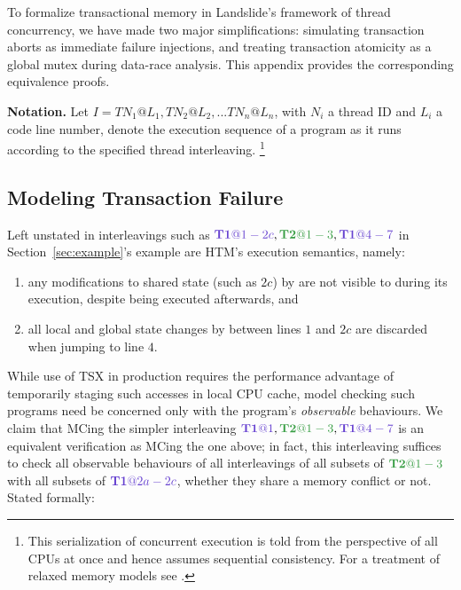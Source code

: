\documentclass{article}
\begin{document}
To formalize transactional memory in Landslide's framework of thread concurrency,
we have made two major simplifications:
simulating transaction aborts as immediate failure injections,
and treating transaction atomicity as a global mutex during data-race analysis.
This appendix provides the corresponding equivalence proofs.

{\bf Notation.} Let $I = TN_1@L_1, TN_2@L_2, ... TN_n@L_n$,
with $N_i$ a thread ID and $L_i$ a code line number,
denote the execution sequence of a program as it runs according to the specified thread interleaving.%
\footnote{This serialization of concurrent execution is told from the perspective of all CPUs at once
and hence assumes sequential consistency.
For a treatment of relaxed memory models see \cite{tsopso}.}

\subsection{Modeling Transaction Failure}

Left unstated in interleavings such as $\tiat{1-2c}, \tjat{1-3}, \tiat{4-7}$ in Section~\ref{sec:example}'s example
are HTM's execution semantics, namely:
\begin{enumerate}
	\item any modifications to shared state (such as $2c$) by \ti are not visible to \tj during its execution,
		despite \tj being executed afterwards, and
	\item all local and global state changes by \ti between lines $1$ and $2c$ are discarded when jumping to line $4$.
\end{enumerate}
While use of TSX in production requires the performance advantage
of temporarily staging such accesses in local CPU cache,
model checking such programs need be concerned only with the program's {\em observable} behaviours.
We claim that MCing the simpler interleaving $\tiat{1}, \tjat{1-3}, \tiat{4-7}$
is an equivalent verification as MCing the one above;
in fact, this interleaving suffices to check
all observable behaviours
of all interleavings
of all subsets of $\tjat{1-3}$
with all subsets of $\tiat{2a-2c}$,
whether they share a memory conflict or not.
Stated formally:

\renewcommand\proofname{Proof Sketch}
\newtheorem{lemma}{Lemma}
\newtheorem{theorem}{Theorem}
\newtheorem{definition}{Definition}
\end{document}
